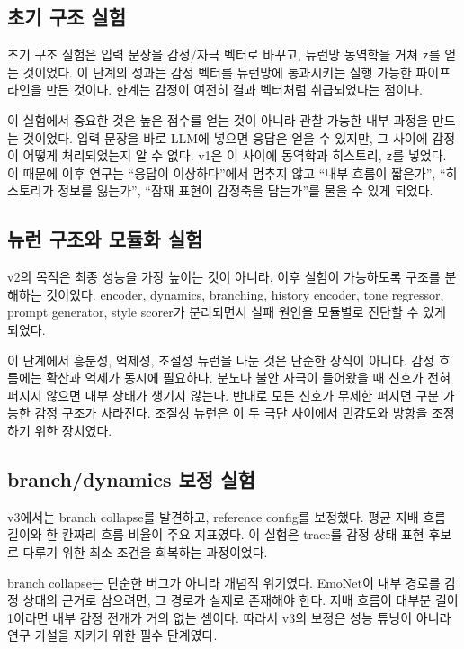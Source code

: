 \documentclass[11pt,a4paper]{article}
\newcommand{\eng}[1]{\texttt{#1}}
\begin{document}
\subsection{초기 구조 실험}

초기 구조 실험은 입력 문장을 감정/자극 벡터로 바꾸고, 뉴런망 동역학을 거쳐 \eng{z}를 얻는 것이었다. 이 단계의 성과는 감정 벡터를 뉴런망에 통과시키는 실행 가능한 파이프라인을 만든 것이다. 한계는 감정이 여전히 결과 벡터처럼 취급되었다는 점이다.

이 실험에서 중요한 것은 높은 점수를 얻는 것이 아니라 관찰 가능한 내부 과정을 만드는 것이었다. 입력 문장을 바로 LLM에 넣으면 응답은 얻을 수 있지만, 그 사이에 감정이 어떻게 처리되었는지 알 수 없다. v1은 이 사이에 동역학과 히스토리, \eng{z}를 넣었다. 이 때문에 이후 연구는 ``응답이 이상하다''에서 멈추지 않고 ``내부 흐름이 짧은가'', ``히스토리가 정보를 잃는가'', ``잠재 표현이 감정축을 담는가''를 물을 수 있게 되었다.

\subsection{뉴런 구조와 모듈화 실험}

v2의 목적은 최종 성능을 가장 높이는 것이 아니라, 이후 실험이 가능하도록 구조를 분해하는 것이었다. encoder, dynamics, branching, history encoder, tone regressor, prompt generator, style scorer가 분리되면서 실패 원인을 모듈별로 진단할 수 있게 되었다.

이 단계에서 흥분성, 억제성, 조절성 뉴런을 나눈 것은 단순한 장식이 아니다. 감정 흐름에는 확산과 억제가 동시에 필요하다. 분노나 불안 자극이 들어왔을 때 신호가 전혀 퍼지지 않으면 내부 상태가 생기지 않는다. 반대로 모든 신호가 무제한 퍼지면 구분 가능한 감정 구조가 사라진다. 조절성 뉴런은 이 두 극단 사이에서 민감도와 방향을 조정하기 위한 장치였다.

\subsection{branch/dynamics 보정 실험}

v3에서는 branch collapse를 발견하고, reference config를 보정했다. 평균 지배 흐름 길이와 한 칸짜리 흐름 비율이 주요 지표였다. 이 실험은 trace를 감정 상태 표현 후보로 다루기 위한 최소 조건을 회복하는 과정이었다.

branch collapse는 단순한 버그가 아니라 개념적 위기였다. EmoNet이 내부 경로를 감정 상태의 근거로 삼으려면, 그 경로가 실제로 존재해야 한다. 지배 흐름이 대부분 길이 1이라면 내부 감정 전개가 거의 없는 셈이다. 따라서 v3의 보정은 성능 튜닝이 아니라 연구 가설을 지키기 위한 필수 단계였다.
\end{document}
